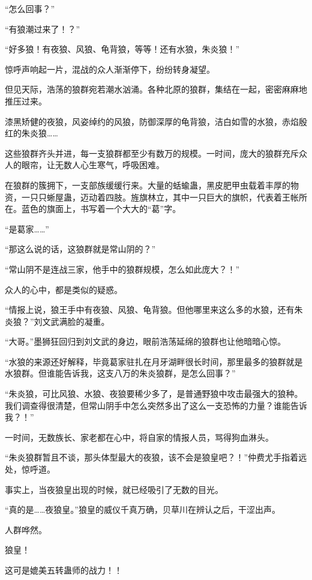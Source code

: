 
\begin{this_body}

“怎么回事？”

“有狼潮过来了！？”

“好多狼！有夜狼、风狼、龟背狼，等等！还有水狼，朱炎狼！”

惊呼声响起一片，混战的众人渐渐停下，纷纷转身凝望。

但见天际，浩荡的狼群宛若潮水汹涌。各种北原的狼群，集结在一起，密密麻麻地推压过来。

漆黑矫健的夜狼，风姿绰约的风狼，防御深厚的龟背狼，洁白如雪的水狼，赤焰殷红的朱炎狼……

这些狼群齐头并进，每一支狼群都至少有数万的规模。一时间，庞大的狼群充斥众人的眼帘，让无数人心生寒气，呼吸困难。

在狼群的簇拥下，一支部族缓缓行来。大量的蛞蝓蛊，黑皮肥甲虫载着丰厚的物资，一只只蜥屋蛊，迈动着四肢。旌旗林立，其中一只巨大的旗帜，代表着王帐所在。蓝色的旗面上，书写着一个大大的“葛”字。

“是葛家……”

“那这么说的话，这狼群就是常山阴的？”

“常山阴不是连战三家，他手中的狼群规模，怎么如此庞大？！”

众人的心中，都是类似的疑惑。

“情报上说，狼王手中有夜狼、风狼、龟背狼。但他哪里来这么多的水狼，还有朱炎狼？”刘文武满脸的凝重。

“大哥。”墨狮狂回归到刘文武的身边，眼前浩荡延绵的狼群也让他暗暗心惊。

“水狼的来源还好解释，毕竟葛家驻扎在月牙湖畔很长时间，那里最多的狼群就是水狼群。但谁能告诉我，这支八万的朱炎狼群，是怎么回事？”

“朱炎狼，可比风狼、水狼、夜狼要稀少多了，是普通野狼中攻击最强大的狼种。我们调查得很清楚，但常山阴手中怎么突然多出了这么一支恐怖的力量？谁能告诉我？！”

一时间，无数族长、家老都在心中，将自家的情报人员，骂得狗血淋头。

“朱炎狼群暂且不谈，那头体型最大的夜狼，该不会是狼皇吧？！”仲费尤手指着远处，惊呼道。

事实上，当夜狼皇出现的时候，就已经吸引了无数的目光。

“真的是……夜狼皇。”狼皇的威仪千真万确，贝草川在辨认之后，干涩出声。

人群哗然。

狼皇！

这可是媲美五转蛊师的战力！！


\end{this_body}
